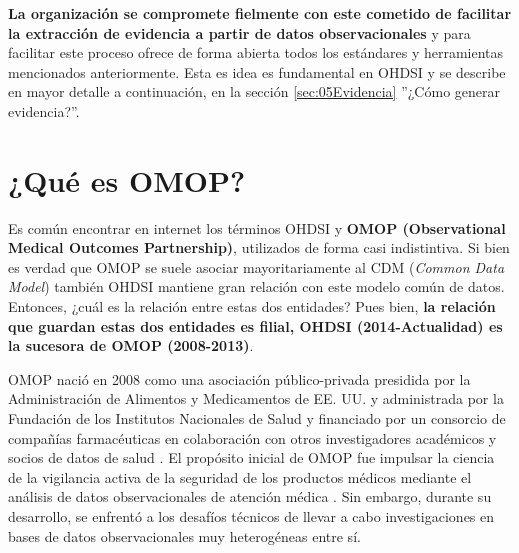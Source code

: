 \begin{itemize}
    \textbf{La organización se compromete fielmente con este cometido de facilitar la extracción de evidencia a partir de datos observacionales} y para facilitar este proceso ofrece de forma abierta todos los estándares y herramientas mencionados anteriormente. Esta es idea es fundamental en OHDSI y se describe en mayor detalle a continuación, en la sección \ref{sec:05Evidencia} ''¿Cómo generar evidencia?''.

\end{itemize}


\section{¿Qué es OMOP?} \label{sec:05omop}

Es común encontrar en internet los términos OHDSI y \textbf{OMOP (Observational Medical Outcomes Partnership)}, utilizados de forma casi indistintiva. Si bien es verdad que OMOP se suele asociar mayoritariamente al CDM (\textit{Common Data Model}) también OHDSI mantiene gran relación con este modelo común de datos. Entonces, ¿cuál es la relación entre estas dos entidades? Pues bien, \textbf{la relación que guardan estas dos entidades es filial, OHDSI (2014-Actualidad) es la sucesora de OMOP (2008-2013)}.

OMOP nació en 2008 como una asociación público-privada presidida por la Administración de Alimentos y Medicamentos de EE. UU. y administrada por la Fundación de los Institutos Nacionales de Salud y financiado por un consorcio de compañías farmacéuticas en colaboración con otros investigadores académicos y socios de datos de salud \parencite{stang2010advancing}. El propósito inicial de OMOP fue impulsar la ciencia de la vigilancia activa de la seguridad de los productos médicos mediante el análisis de datos observacionales de atención médica \parencite{stang2010advancing}. Sin embargo, durante su desarrollo, se enfrentó a los desafíos técnicos de llevar a cabo investigaciones en bases de datos observacionales muy heterogéneas entre sí.

